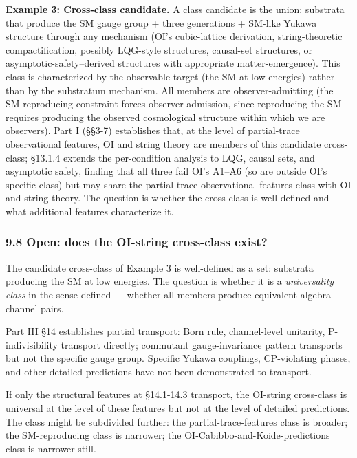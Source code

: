 \documentclass[
]{article}
\begin{document}
\textbf{Example 3: Cross-class candidate.} A class candidate is the
union: substrata that produce the SM gauge group + three generations +
SM-like Yukawa structure through any mechanism (OI's cubic-lattice
derivation, string-theoretic compactification, possibly LQG-style
structures, causal-set structures, or asymptotic-safety--derived
structures with appropriate matter-emergence). This class is
characterized by the observable target (the SM at low energies) rather
than by the substratum mechanism. All members are observer-admitting
(the SM-reproducing constraint forces observer-admission, since
reproducing the SM requires producing the observed cosmological
structure within which we are observers). Part I (§§3-7) establishes
that, at the level of partial-trace observational features, OI and
string theory are members of this candidate cross-class; §13.1.4 extends
the per-condition analysis to LQG, causal sets, and asymptotic safety,
finding that all three fail OI's A1--A6 (so are outside OI's specific
class) but may share the partial-trace observational features class with
OI and string theory. The question is whether the cross-class is
well-defined and what additional features characterize it.

\hypertarget{open-does-the-oi-string-cross-class-exist}{%
\subsubsection{9.8 Open: does the OI-string cross-class
exist?}\label{open-does-the-oi-string-cross-class-exist}}

The candidate cross-class of Example 3 is well-defined as a set:
substrata producing the SM at low energies. The question is whether it
is a \emph{universality class} in the sense defined --- whether all
members produce equivalent algebra-channel pairs.

Part III §14 establishes partial transport: Born rule, channel-level
unitarity, P-indivisibility transport directly; commutant
gauge-invariance pattern transports but not the specific gauge group.
Specific Yukawa couplings, CP-violating phases, and other detailed
predictions have not been demonstrated to transport.

If only the structural features at §14.1-14.3 transport, the OI-string
cross-class is universal at the level of these features but not at the
level of detailed predictions. The class might be subdivided further:
the partial-trace-features class is broader; the SM-reproducing class is
narrower; the OI-Cabibbo-and-Koide-predictions class is narrower still.
\end{document}

